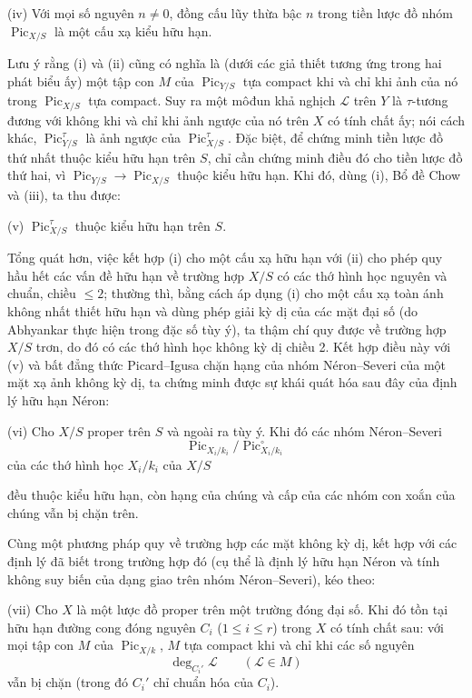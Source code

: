 \documentclass[11pt,twoside,openany]{book}
\numberwithin{equation}{section}
\newcommand{\src}[1]{%
  \phantomsection\hypertarget{src:\fgasourceid:#1}{}%
  \marginpar{\raggedleft\footnotesize\sffamily #1}%
}
\newcommand{\fgasourceid}{unset}
\begin{document}
\noindent(iv) Với mọi số nguyên $n\neq0$, đồng cấu lũy thừa bậc $n$ trong
tiền lược đồ nhóm $\operatorname{Pic}_{X/S}$ là một cấu xạ kiểu hữu hạn.

Lưu ý rằng (i) và (ii) cũng có nghĩa là (dưới các giả thiết tương ứng trong
hai phát biểu ấy) một tập con $M$ của $\operatorname{Pic}_{Y/S}$ tựa compact
khi và chỉ khi ảnh của nó trong $\operatorname{Pic}_{X/S}$ tựa compact. Suy
ra một môđun khả nghịch $\mathcal L$ trên $Y$ là $\tau$-tương đương với không
khi và chỉ khi ảnh ngược của nó trên $X$ có tính chất ấy; nói cách khác,
$\operatorname{Pic}_{Y/S}^\tau$ là ảnh ngược của
$\operatorname{Pic}_{X/S}^\tau$. Đặc biệt, để chứng minh tiền lược đồ thứ
nhất thuộc kiểu hữu hạn trên $S$, chỉ cần chứng minh điều đó cho tiền lược đồ
thứ hai, vì $\operatorname{Pic}_{Y/S}\longrightarrow
\operatorname{Pic}_{X/S}$ thuộc kiểu hữu hạn. Khi đó, dùng (i), Bổ đề Chow và
(iii), ta thu được:

\medskip
\noindent(v) $\operatorname{Pic}_{X/S}^\tau$ thuộc kiểu hữu hạn trên $S$.

Tổng quát hơn, việc kết hợp (i) cho một cấu xạ hữu hạn với (ii) cho phép quy
hầu hết các vấn đề hữu hạn về trường hợp $X/S$ có các thớ hình học nguyên và
chuẩn, chiều $\leq2$; thường thì, bằng cách áp dụng (i) cho một cấu xạ toàn
ánh không nhất thiết hữu hạn và dùng phép giải kỳ dị của các mặt đại số (do
Abhyankar thực hiện trong đặc số tùy ý), ta thậm chí quy được về trường hợp
$X/S$ trơn, do đó có các thớ hình học không kỳ dị chiều 2. Kết hợp điều này
với (v) và bất đẳng thức Picard--Igusa chặn hạng của nhóm Néron--Severi của
một mặt xạ ảnh không kỳ dị, ta chứng minh được sự khái quát hóa sau đây của
định lý hữu hạn Néron:

\medskip
\noindent(vi) Cho $X/S$ proper trên $S$ và ngoài ra tùy ý. Khi đó các nhóm
Néron--Severi
\[
\operatorname{Pic}_{X_i/k_i}/\operatorname{Pic}_{X_i/k_i}^\circ
\]
của các thớ hình học $X_i/k_i$ của $X/S$

\src{305}
đều thuộc kiểu hữu hạn, còn hạng của chúng và cấp của các nhóm con xoắn của
chúng vẫn bị chặn trên.

Cùng một phương pháp quy về trường hợp các mặt không kỳ dị, kết hợp với các
định lý đã biết trong trường hợp đó (cụ thể là định lý hữu hạn Néron và tính
không suy biến của dạng giao trên nhóm Néron--Severi), kéo theo:

\medskip
\noindent(vii) Cho $X$ là một lược đồ proper trên một trường đóng đại số. Khi
đó tồn tại hữu hạn đường cong đóng nguyên $C_i$ ($1\leq i\leq r$) trong $X$
có tính chất sau: với mọi tập con $M$ của $\operatorname{Pic}_{X/k}$, $M$ tựa
compact khi và chỉ khi các số nguyên
\[
\deg_{C_i'}\mathcal L\qquad(\mathcal L\in M)
\]
vẫn bị chặn (trong đó $C_i'$ chỉ chuẩn hóa của $C_i$).
\end{document}

